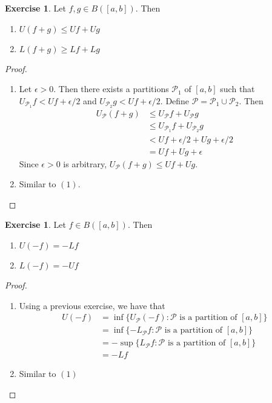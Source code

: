 \documentclass{book}
\theoremstyle{definition}
\newtheorem{ex}[definition]{Exercise}
\newcommand{\ep}{\epsilon}
\newcommand{\MP}{\mathcal{P}}
\newcommand{\lex}[1]{\label{ex:#1}}
\DeclareMathOperator*{\0}{\mbf{0}}
\DeclareMathOperator*{\1}{\mbf{1}}
\begin{document}
	\begin{ex} \lex{00000} 
		Let $f, g \in B([a,b])$. Then 
		\begin{enumerate}
			\item $U(f+g) \leq U f + U g$
			\item $L(f+g) \geq L f + L g$
		\end{enumerate}
	\end{ex}

	\begin{proof}\
		\begin{enumerate}
			\item Let $\ep >0$. Then there exists a partitions $\MP_1$ of $[a,b]$ such that $U_{\MP_1} f < U f + \ep/2$ and $U_{\MP_2} g < U f + \ep/2$. Define $\MP = \MP_1 \cup \MP_2$. Then 
			\begin{align*}
				U_\MP(f +g) 
				&\leq U_\MP f + U_\MP g \\
				&\leq U_{\MP_1} f + U_{\MP_2} g \\
				&< U f + \ep/2 +  U g + \ep/2 \\
				&= Uf + Ug + \ep
			\end{align*}
			Since $\ep >0$ is arbitrary, $U_\MP(f +g)  \leq Uf + Ug$.
			\item Similar to $(1)$.
		\end{enumerate}
	\end{proof}

	\begin{ex} \lex{00000} 
		Let $f \in B([a,b])$. Then 
		\begin{enumerate}
			\item $U(-f) = -Lf$
			\item $L(-f) = -Uf$
		\end{enumerate}
	\end{ex}

	\begin{proof} \
		\begin{enumerate}
			\item Using a previous exercise, we have that
			\begin{align*}
				U(-f)
				&= \inf \{U_\MP(-f): \MP \text{ is a partition of } [a,b]\} \\
				&= \inf \{ -L_\MP f: \MP \text{ is a partition of } [a,b]\} \\
				&= - \sup \{L_\MP f: \MP \text{ is a partition of } [a,b]\} \\
				&= - Lf
			\end{align*}
			\item Similar to $(1)$
		\end{enumerate}
	\end{proof}
\end{document}
